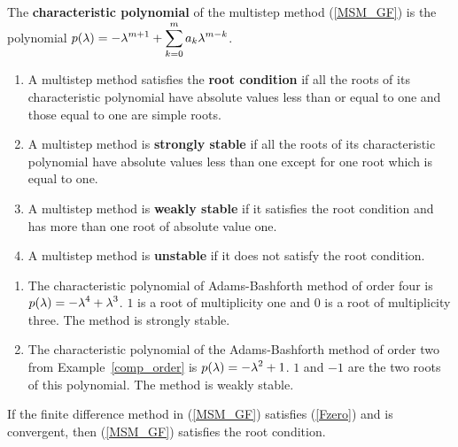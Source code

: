 \begin{defn}
The {\bfseries characteristic polynomial}
of the multistep method (\ref{MSM_GF}) is the polynomial
$\displaystyle p(\lambda) = - \lambda^{m+1} + \sum_{k=0}^m a_k \lambda^{m-k}$.
\end{defn}

\begin{defn}
\begin{enumerate}
\item A multistep method satisfies the
{\bfseries root condition} if all the roots of its
characteristic polynomial have absolute values less 
than or equal to one and those equal to one are simple roots.
\item A multistep method is {\bfseries strongly stable}
if all the roots of its characteristic polynomial have absolute values less
than one except for one root which is equal to one.
\item A multistep method is {\bfseries weakly stable}
if it satisfies the root condition and has more than one root of absolute
value one.
\item A multistep method is {\bfseries unstable} if it does
not satisfy the root condition.
\end{enumerate}
\end{defn}

\begin{eggList}\label{comp_stab}
\begin{enumerate}
\item The characteristic polynomial of
Adams-Bashforth method of order four is
$\displaystyle p(\lambda) = - \lambda^4 + \lambda^3$.  $1$ is a root of 
multiplicity one and $0$ is a root of multiplicity three.  The method
is strongly stable.
\item The characteristic polynomial of the
Adams-Bashforth method of order two from Example~\ref{comp_order} is
$\displaystyle p(\lambda) = -\lambda^2 + 1$.  $1$ and $-1$  are the
two roots of this polynomial.  The method is weakly stable.
\end{enumerate}
\end{eggList}

\begin{prop}
If the finite difference method in (\ref{MSM_GF}) satisfies (\ref{Fzero})
and is convergent, then (\ref{MSM_GF}) satisfies the root condition.
\label{SimpliesRC}
\end{prop}

